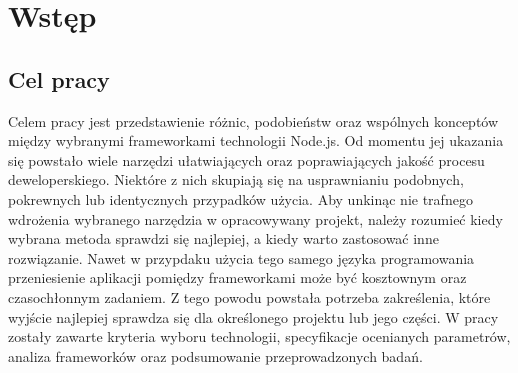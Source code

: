 \documentclass[12pt]{report}
\begin{document}
\tableofcontents
\chapter{Wstęp}

  \section{Cel pracy}
    Celem pracy jest przedstawienie różnic, podobieństw oraz wspólnych konceptów między wybranymi frameworkami technologii Node.js.
    Od momentu jej ukazania się powstało wiele narzędzi ułatwiających oraz poprawiających jakość procesu deweloperskiego.
    Niektóre z nich skupiają się na usprawnianiu podobnych, pokrewnych lub identycznych przypadków użycia.
    Aby unkinąc nie trafnego wdrożenia wybranego narzędzia w opracowywany projekt, należy rozumieć kiedy wybrana metoda sprawdzi się najlepiej, a kiedy warto zastosować inne rozwiązanie.
    Nawet w przypdaku użycia tego samego języka programowania przeniesienie aplikacji pomiędzy frameworkami może być kosztownym oraz czasochłonnym zadaniem.
    Z tego powodu powstała potrzeba zakreślenia, które wyjście najlepiej sprawdza się dla określonego projektu lub jego części.
    W pracy zostały zawarte kryteria wyboru technologii, specyfikacje ocenianych parametrów, analiza frameworków oraz podsumowanie przeprowadzonych badań.
\end{document}
